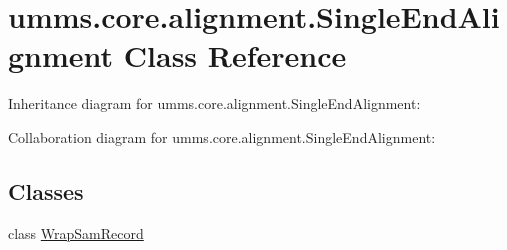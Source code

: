 \hypertarget{classumms_1_1core_1_1alignment_1_1_single_end_alignment}{\section{umms.\+core.\+alignment.\+Single\+End\+Alignment Class Reference}
\label{classumms_1_1core_1_1alignment_1_1_single_end_alignment}
}


Inheritance diagram for umms.\+core.\+alignment.\+Single\+End\+Alignment\+:


Collaboration diagram for umms.\+core.\+alignment.\+Single\+End\+Alignment\+:
\subsection*{Classes}
\begin{DoxyCompactItemize}
\item 
class \hyperlink{classumms_1_1core_1_1alignment_1_1_single_end_alignment_1_1_wrap_sam_record}{Wrap\+Sam\+Record}
\end{DoxyCompactItemize}
